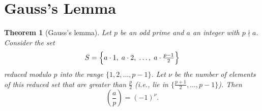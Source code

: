 \documentclass[12pt,a4paper,openany]{book}
\theoremstyle{definition}
\theoremstyle{plain}
\newtheorem{theorem}[definition]{Theorem}
\theoremstyle{remark}
\newcommand{\legendre}[2]{\left(\frac{#1}{#2}\right)}
\begin{document}
\section{Gauss's Lemma}
\label{sec:gauss-lemma}

\begin{theorem}[Gauss's lemma]
\label{thm:gauss-lemma}
Let $p$ be an odd prime and $a$ an integer with $p \nmid a$. Consider the set
\[
  S = \Bigl\{ a \cdot 1, \; a \cdot 2, \; \ldots, \; a \cdot \tfrac{p-1}{2} \Bigr\}
\]
reduced modulo $p$ into the range $\{1, 2, \ldots, p-1\}$.
Let $\nu$ be the number of elements of this reduced set that are greater than $\frac{p}{2}$
\textup{(}i.e., lie in $\bigl\{\frac{p+1}{2}, \ldots, p-1\bigr\}$\textup{)}.
Then
\begin{equation}
\label{eq:gauss-lemma}
  \legendre{a}{p} = (-1)^\nu.
\end{equation}
\end{theorem}
\end{document}
